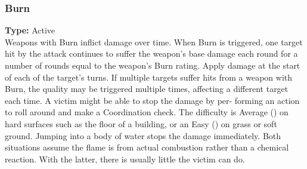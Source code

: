 \subsubsection{Burn}
\label{iqty:burn}
\textbf{Type:} Active\\
Weapons with Burn inflict damage over time. When
Burn is triggered, one target hit by the attack continues
to suffer the weapon’s base damage each round for a
number of rounds equal to the weapon’s Burn rating.
Apply damage at the start of each of the target’s turns.
If multiple targets suffer hits from a weapon with Burn,
the quality may be triggered multiple times, affecting a
different target each time.
A victim might be able to stop the damage by per-
forming an action to roll around and make a Coordination check.
The difficulty is Average (\difficulty\difficulty) on hard
surfaces such as the floor of a building, or an Easy (\difficulty)
on grass or soft ground. Jumping into a body of water
stops the damage immediately. Both situations assume
the flame is from actual combustion rather than a
chemical reaction. With the latter, there is usually little
the victim can do.
